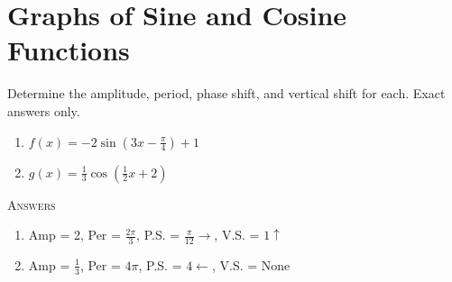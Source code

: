 \chapter{Graphs of Sine and Cosine Functions}

Determine the amplitude, period, phase shift, and vertical shift for each. Exact answers only.

\begin{enumerate}
	\item $f(x) = -2\sin\left(3x-\frac{\pi}{4}\right) + 1$
	\item $g(x) = \frac{1}{3}\cos\left(\frac{1}{2}x + 2\right)$
\end{enumerate}
\setcounter{Review}{\value{enumi}}

\newpage

\textsc{Answers}

\begin{enumerate}
	\item Amp = 2, Per = $\frac{2\pi}{3}$, P.S. = $\frac{\pi}{12} \rightarrow$, V.S. = $1 \uparrow$
    \item Amp = $\frac{1}{3}$, Per = $4\pi$, P.S. = $4 \leftarrow$, V.S. = None
\end{enumerate}